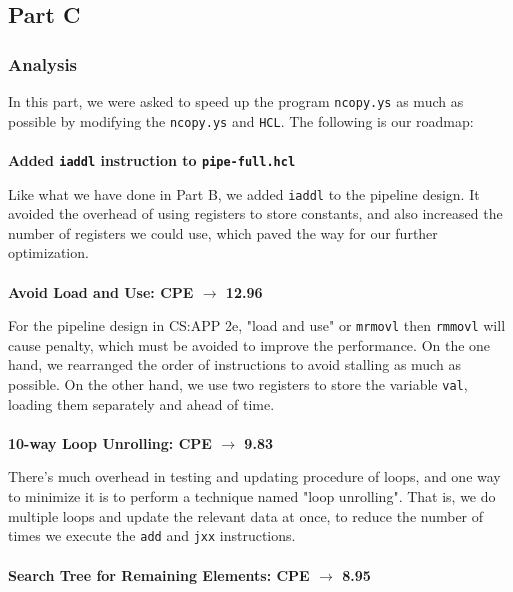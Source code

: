 \documentclass[12pt,a4paper]{article}
\begin{document}
\subsection{Part C}
\subsubsection{Analysis}
In this part, we were asked to speed up the program \texttt{ncopy.ys} as much as possible by modifying the \texttt{ncopy.ys} and \texttt{HCL}.
The following is our roadmap:\\
\\
\textbf{Added \texttt{iaddl} instruction to \texttt{pipe-full.hcl} }

Like what we have done in Part B, we added \texttt{iaddl} to the pipeline design. It avoided the overhead of using registers to store constants, and also increased the number of registers we could use, which paved the way for our further optimization.\\
\\
\textbf{Avoid Load and Use: CPE $\rightarrow$ 12.96}

For the pipeline design in CS:APP 2e, "load and use" or \texttt{mrmovl} then \texttt{rmmovl} will cause penalty,
which must be avoided to improve the performance. On the one hand, we rearranged the order of 
instructions to avoid stalling as much as possible. On the other hand, we use two registers to store 
the variable \texttt{val}, loading them separately and ahead of time.\\
\\
\textbf{10-way Loop Unrolling:  CPE $\rightarrow$ 9.83}

There's much overhead in testing and updating procedure of loops, and one way to minimize it is to 
perform a technique named "loop unrolling". That is, we do multiple loops and update the relevant 
data at once, to reduce the number of times we execute the \texttt{add} and \texttt{jxx} instructions. \\
\\
\textbf{Search Tree for Remaining Elements:  CPE $\rightarrow$ 8.95}
\end{document}
